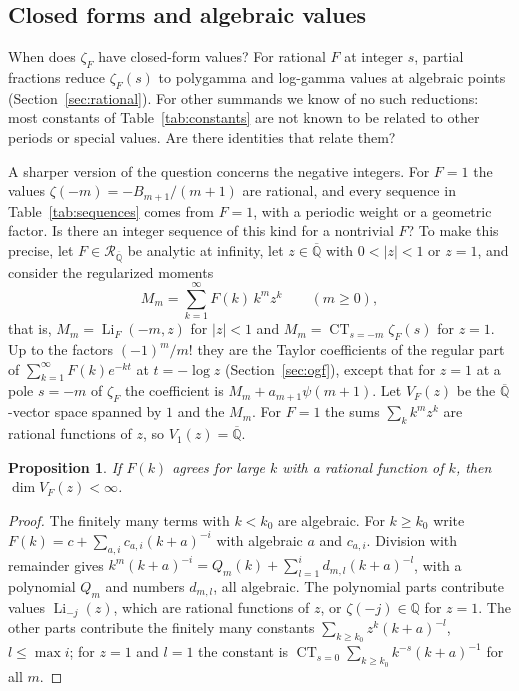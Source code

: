 \documentclass[11pt,reqno]{amsart}
\newtheorem{proposition}[theorem]{Proposition}
\theoremstyle{definition}
\theoremstyle{remark}
\newcommand{\Li}{\operatorname{Li}}
\newcommand{\QQ}{\mathbb{Q}}
\newcommand{\Qbar}{\overline{\mathbb{Q}}}
\newcommand{\RegQ}{\mathcal{R}_{\Qbar}}
\newcommand{\CT}{\operatorname*{CT}}
\begin{document}
\subsection{Closed forms and algebraic values}
When does $\zeta_F$ have closed-form values? For rational $F$ at integer $s$, partial fractions reduce $\zeta_F(s)$
to polygamma and log-gamma values at algebraic points (Section~\ref{sec:rational}). For other summands we know of no
such reductions: most constants of Table~\ref{tab:constants} are not known to be related to
other periods or special values. Are there identities that relate them?

A sharper version of the question concerns the negative integers. For $F = 1$ the values $\zeta(-m) = -B_{m+1}/(m+1)$
are rational, and every sequence in Table~\ref{tab:sequences} comes from $F = 1$, with a periodic weight or a geometric
factor. Is there an integer sequence of this kind for a nontrivial $F$? To make this precise, let $F \in \RegQ$ be
analytic at infinity, let $z \in \Qbar$ with $0 < |z| < 1$ or $z = 1$, and consider the regularized moments
\[
  M_m = \sum_{k=1}^{\infty}F(k)\,k^mz^k \qquad (m \ge 0),
\]
that is, $M_m = \Li_F(-m, z)$ for $|z| < 1$ and $M_m = \CT_{s=-m}\zeta_F(s)$ for $z = 1$. Up to the factors
$(-1)^m/m!$ they are the Taylor coefficients of the regular part of $\sum_{k=1}^{\infty}F(k)e^{-kt}$ at $t = -\log z$
(Section~\ref{sec:ogf}), except that for $z = 1$ at a pole $s = -m$ of $\zeta_F$ the coefficient is
$M_m + a_{m+1}\psi(m+1)$. Let $V_F(z)$ be the $\Qbar$-vector space spanned by $1$ and the $M_m$. For $F = 1$ the sums
$\sum_kk^mz^k$ are rational functions of $z$, so $V_1(z) = \Qbar$.

\begin{proposition}\label{prop:rationalF}
If $F(k)$ agrees for large $k$ with a rational function of $k$, then $\dim V_F(z) < \infty$.
\end{proposition}

\begin{proof}
The finitely many terms with $k < k_0$ are algebraic. For $k \ge k_0$ write $F(k) = c + \sum_{a,i}c_{a,i}(k+a)^{-i}$
with algebraic $a$ and $c_{a,i}$. Division with remainder gives $k^m(k+a)^{-i} = Q_m(k) + \sum_{l=1}^{i}d_{m,l}(k+a)^{-l}$,
with a polynomial $Q_m$ and numbers $d_{m,l}$, all algebraic. The polynomial parts contribute values $\Li_{-j}(z)$,
which are rational functions of $z$, or $\zeta(-j) \in \QQ$ for $z = 1$. The other parts contribute the finitely many
constants $\sum_{k\ge k_0}z^k(k+a)^{-l}$, $l \le \max i$; for $z = 1$ and $l = 1$ the constant is
$\CT_{s=0}\sum_{k\ge k_0}k^{-s}(k+a)^{-1}$ for all $m$.
\end{proof}
\end{document}
